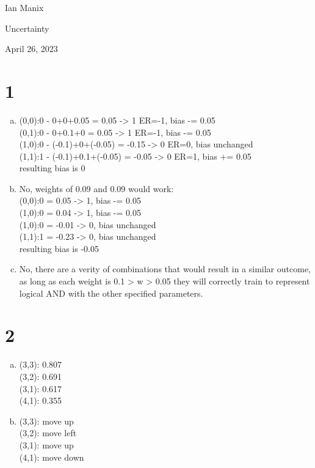\documentclass{article}
\begin{document}
    \begin{FlushLeft}
        Ian Manix

        Uncertainty

        April 26, 2023
    \end{FlushLeft}


    \section*{1}

    \begin{enumerate}[a)]
        \item   (0,0):0 - 0+0+0.05 = 0.05 -> 1 ER=-1, bias -= 0.05 \\
                (0,1):0 - 0+0.1+0  = 0.05 -> 1 ER=-1, bias -= 0.05 \\
                (1,0):0 - (-0.1)+0+(-0.05) = -0.15 -> 0 ER=0, bias unchanged \\
                (1,1):1 - (-0.1)+0.1+(-0.05) = -0.05 -> 0 ER=1, bias += 0.05 \\
                resulting bias is 0

        \item   No, weights of 0.09 and 0.09 would work: \\
                (0,0):0 = 0.05 -> 1, bias -= 0.05 \\
                (1,0):0 = 0.04 -> 1, bias -= 0.05 \\
                (1,0):0 = -0.01 -> 0, bias unchanged \\
                (1,1):1 = -0.23 -> 0, bias unchanged \\
                resulting bias is -0.05

        \item   No, there are a verity of combinations that would result in a similar outcome, as long as each weight is 0.1 > w > 0.05 they will correctly train to represent logical AND with the other specified parameters. 
    \end{enumerate}


    \section*{2}

    \begin{enumerate}[a)]
        \item   (3,3): 0.807 \\
                (3,2): 0.691 \\
                (3,1): 0.617 \\
                (4,1): 0.355
        \item   (3,3): move up \\
                (3,2): move left \\
                (3,1): move up \\
                (4,1): move down
    \end{enumerate}
\end{document}
